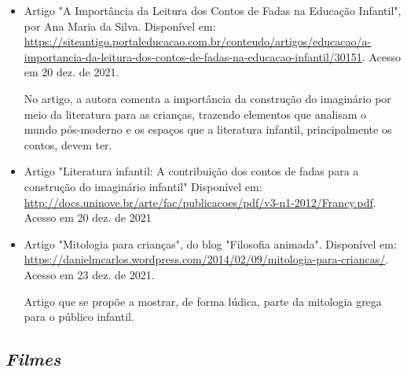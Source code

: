 \documentclass[11pt]{extarticle}
\begin{document}
\begin{itemize}
\item Artigo "A Importância da Leitura dos Contos de Fadas na Educação Infantil", por Ana Maria da Silva. Disponível em: \url{https://siteantigo.portaleducacao.com.br/conteudo/artigos/educacao/a-importancia-da-leitura-dos-contos-de-fadas-na-educacao-infantil/30151}. 
Acesso em 20 dez. de 2021.

No artigo, a autora comenta a importância da construção do imaginário por meio da literatura para as crianças, trazendo elementos que analisam o mundo pós-moderno e os espaços que a literatura infantil, principalmente os contos, devem ter.

\item Artigo "Literatura infantil: A contribuição dos contos de fadas para a construção do imaginário infantil" Disponível em: \url{http://docs.uninove.br/arte/fac/publicacoes/pdf/v3-n1-2012/Francy.pdf}. Acesso em 20 dez. de 2021

\item Artigo "Mitologia para crianças", do blog "Filosofia animada". Disponível em: \url{https://danielmcarlos.wordpress.com/2014/02/09/mitologia-para-criancas/}. Acesso em 23 dez. de 2021. 

Artigo que se propõe a mostrar, de forma lúdica, parte da mitologia grega para o público infantil.

\end{itemize}

\subsection{\textit{Filmes}}
\end{document}
